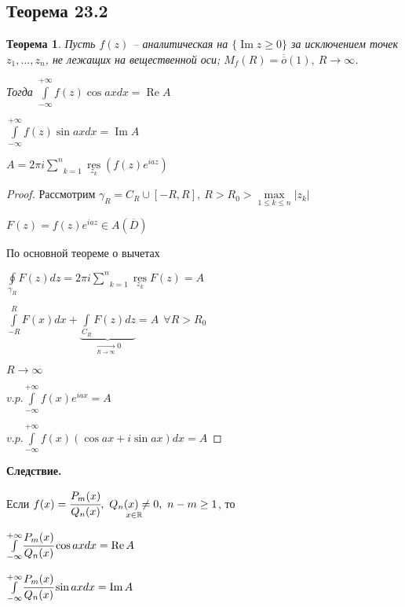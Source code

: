 \documentclass[draft]{report}
\newcommand{\res}{\mathop{\mathrm{res}}\nolimits}
\renewcommand{\bf}{\bfseries}
\newcommand{\R}{\mathbb{R}}
\newcommand{\mint}[2]{\underset{#1}{\overset{#2}{\int}}}
\newcommand{\moint}[1]{\underset{#1}{\oint}}
\newcommand{\msum}[2]{\underset{#1}{\overset{#2}{\sum}}}
\newcommand{\mres}[1]{\underset{#1}{\res}}
\newcommand{\mmax}[1]{\underset{#1}{\max}}
\renewcommand{\bar}{\overline}
\renewcommand{\Im}{\mathop{\mathrm{Im}}\nolimits}
\renewcommand{\Re}{\mathop{\mathrm{Re}}\nolimits}
\newcommand{\g}{\gamma}
\newcommand{\F}{\ \forall}
\newcommand{\lra}[1]{\underset{#1}{\longrightarrow}}
\newtheorem*{theor}{Теорема}
\theoremstyle{remark}
\begin{document}
\subsection{Теорема 23.2}

\begin{theor}
Пусть $f(z)$ -- аналитическая на $\{\Im z\geq0\}$ за исключением точек $z_1,\ldots,z_n$, не лежащих на вещественной оси; $M_f(R)=\bar{\bar{o}}(1),\ R\to\infty$.

Тогда $\mint{-\infty}{+\infty}f(z)\cos axdx=\Re A$

$\mint{-\infty}{+\infty}f(z)\sin axdx=\Im A$

$A=2\pi i\msum{k=1}{n}\mres{z_k}\left(f(z)e^{iaz}\right)$
\end{theor}
\begin{proof}
Рассмотрим $\g_R=C_R\cup[-R,R],\ R>R_0>\mmax{1\leq k\leq n}|z_k|$

$F(z)=f(z)e^{iaz}\in A(\bar{D})$

По основной теореме о вычетах

$\moint{\g_R}F(z)dz=2\pi i\msum{k=1}{n}\mres{z_k}F(z)=A$

$\mint{-R}{R}F(x)dx+\underset{\lra{R\to\infty}0}{\underbrace{\mint{C_R}{}F(z)dz}}=A\ \F R>R_0$

$R\to\infty$

$v.p.\mint{-\infty}{+\infty}f(x)e^{iax}=A$

$v.p.\mint{-\infty}{+\infty}f(x)(\cos ax+i\sin ax)dx=A$
\end{proof}
{\bf Следствие.}

Если $f(x)=\cfrac{P_m(x)}{Q_n(x)},\ \underset{x\in\R}{Q_n(x)\neq0},\ n-m\geq1$, то

$\mint{-\infty}{+\infty}\cfrac{P_m(x)}{Q_n(x)}\cos axdx=\Re A$

$\mint{-\infty}{+\infty}\cfrac{P_m(x)}{Q_n(x)}\sin axdx=\Im A$
\end{document}
